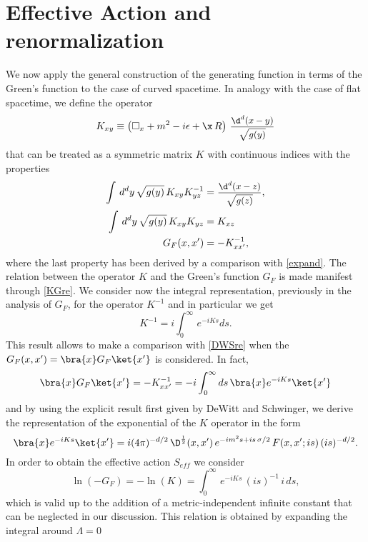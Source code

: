 \documentclass[a4paper,11pt,openright,twoside]{book}
\let\e=\epsilon \let\z=\zeta   \let\h=\eta     \let\q=\theta
\let\s=\sigma  \let\t=\tau     \let\u=\upsilon \let\f=\phi
\newcommand{\sdfrac}[2]{\mbox{\small$\displaystyle\frac{#1}{#2}$}}
\numberwithin{equation}{section}
\begin{document}
{{{	\section{Effective Action and renormalization}
	We now apply the general construction of the generating function in terms of the Green's function to the case of curved spacetime. In analogy with the case of flat spacetime, we define the operator 
	\begin{equation}
		K_{xy}\equiv \left(\square_x+m^2-i\e+\x\,R\right)\,\sdfrac{\d^d(x-y)}{\sqrt{g(y)}}
	\end{equation}
	that can be treated  as a symmetric matrix $K$ with continuous indices with the properties
	\begin{align}
		\int\,d^dy\,\sqrt{g(y)}\,K_{xy}K_{yz}^{-1}&=\sdfrac{\d^d(x-z)}{\sqrt{g(z)}},\\
		\int\,d^dy\,\sqrt{g(y)}\,K_{xy}K_{yz}&=K_{xz}\\
		G_F(x,x')&=-K_{xx'}^{-1}\label{KGre},
	\end{align}
	where the last property has been derived by a comparison with \eqref{expand}. The relation between the operator $K$ and the Green's function $G_F$ is made manifest through \eqref{KGre}. We consider now the integral representation, previously in the analysis of $G_F$, for the operator $K^{-1}$ and in particular we get
	\begin{equation}
		K^{-1}=i\int_0^\infty \,e^{-iKs}ds.
	\end{equation}
	This result allows to make a comparison with \eqref{DWSre} when the $G_F(x,x')=\bra{x}G_F\ket{x'}$ is considered. In fact,
	\begin{align}
		\bra{x}G_F\ket{x'}=-K^{-1}_{xx'}=-i\int_0^\infty ds\,\bra{x}e^{-iKs}\ket{x'}
	\end{align}
	and by using the explicit result first given by DeWitt and Schwinger, we derive the representation of the exponential of the $K$ operator in the form 
	\begin{equation}
		\bra{x}e^{-iKs}\ket{x'}=i(4\pi)^{-d/2}\,\D^{\frac{1}{2}}(x,x')\,e^{-im^2s+is\,\s/2}\,F(x,x';is)\,(is)^{-d/2}.\label{DWSrep}
	\end{equation}
	In order to obtain the effective action $S_{eff}$ we consider 
	\begin{equation}
		\ln(-G_F)=-\ln(K)=\int_0^\infty\,e^{-iKs}\,(is)^{-1}\,i\,ds,\label{logG}
	\end{equation}
	which is valid up to the addition of a metric-independent infinite constant that can be neglected in our discussion. This relation is obtained by expanding the integral around $\Lambda=0$
}}}
\end{document}
